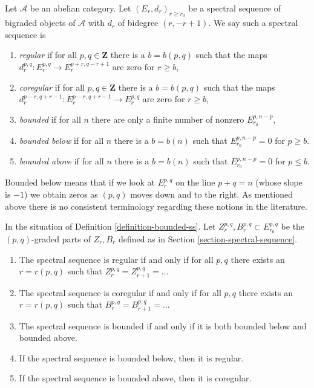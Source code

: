 \begin{definition}
\label{definition-bounded-ss}
Let $\mathcal{A}$ be an abelian category. Let $(E_r, d_r)_{r \geq r_0}$
be a spectral sequence of bigraded objects of
$\mathcal{A}$ with $d_r$ of bidegree $(r, -r + 1)$.
We say such a spectral sequence is
\begin{enumerate}
\item {\it regular} if for all $p, q \in \mathbf{Z}$ there is
a $b = b(p, q)$ such that the maps
$d_r^{p, q} : E_r^{p, q} \to E_r^{p + r, q - r + 1}$ are zero for $r \geq b$,
\item {\it coregular} if for all $p, q \in \mathbf{Z}$ there is a
$b = b(p, q)$ such that the maps
$d_r^{p - r, q + r - 1} : E_r^{p - r, q + r - 1} \to E_r^{p, q}$
are zero for $r \geq b$,
\item {\it bounded} if for all $n$
there are only a finite number of nonzero $E_{r_0}^{p, n - p}$,
\item {\it bounded below} if for all $n$ there is a $b = b(n)$ such that
$E_{r_0}^{p, n - p} = 0$ for $p \geq b$.
\item {\it bounded above} if for all $n$ there is a $b = b(n)$ such that
$E_{r_0}^{p, n - p} = 0$ for $p \leq b$.
\end{enumerate}
\end{definition}

\noindent
Bounded below means that if we look at $E_r^{p, q}$ on the line
$p + q = n$ (whose slope is $-1$) we obtain zeros as $(p, q)$
moves down and to the right.
As mentioned above there is no consistent terminology regarding
these notions in the literature.

\begin{lemma}
\label{lemma-relate-boundedness}
In the situation of Definition \ref{definition-bounded-ss}.
Let $Z_r^{p, q}, B_r^{p, q} \subset E_{r_0}^{p, q}$ be the
$(p, q)$-graded parts of $Z_r, B_r$ defined as in
Section \ref{section-spectral-sequence}.
\begin{enumerate}
\item The spectral sequence is regular if and only if for all $p, q$
there exists an $r = r(p, q)$ such that
$Z_r^{p, q} = Z_{r + 1}^{p, q} = \ldots$
\item The spectral sequence is coregular if and only if for all $p, q$
there exists an $r = r(p, q)$ such that
$B_r^{p, q} = B_{r + 1}^{p, q} = \ldots$
\item The spectral sequence is bounded if and only if it is both
bounded below and bounded above.
\item If the spectral sequence is bounded below, then it is regular.
\item If the spectral sequence is bounded above, then it is coregular.
\end{enumerate}
\end{lemma}

